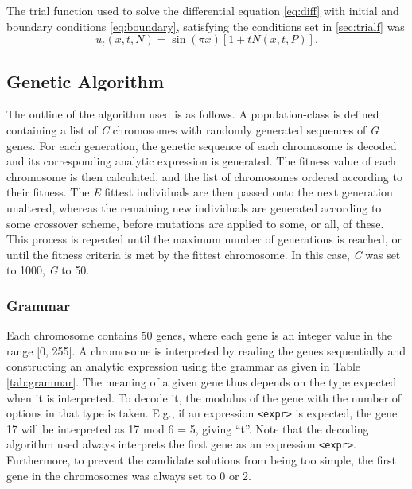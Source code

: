 \documentclass[multicolumn, 9pt]{extarticle}
\begin{document}
The trial function used to solve the differential equation \eqref{eq:diff} with initial and boundary conditions \eqref{eq:boundary}, satisfying the conditions set in \ref{sec:trialf} was
\begin{equation}
	u_t(x, t, N) = \sin{(\pi x)}[1 + tN(x, t, P)].
\end{equation}


\subsection{Genetic Algorithm}
The outline of the algorithm used is as follows. A population-class is defined containing a list of \textit{C} chromosomes with randomly generated sequences of \textit{G} genes. For each generation, the genetic sequence of each chromosome is decoded and its corresponding analytic expression is generated. The fitness value of each chromosome is then calculated, and the list of chromosomes ordered according to their fitness. 
The \textit{E} fittest individuals are then passed onto the next generation unaltered, whereas the remaining new individuals are generated according to some crossover scheme, before mutations are applied to some, or all, of these.  This process is repeated until the maximum number of generations is reached, or until the fitness criteria is met by the fittest chromosome. In this case, \textit{C} was set to 1000, \textit{G} to 50.

\subsubsection{Grammar}
Each chromosome contains 50 genes, where each gene is an integer value in the range [0, 255]. A chromosome is interpreted by reading the genes sequentially and constructing an analytic expression using the grammar as given in Table \ref{tab:grammar}. The meaning of a given gene thus depends on the type expected when it is interpreted. To decode it, the modulus of the gene with the number of options in that type is taken. E.g., if an expression \texttt{<expr>} is expected, the gene 17 will be interpreted as 17 mod 6 = 5, giving ``t''. Note that the decoding algorithm used always interprets the first gene as an expression \texttt{<expr>}.  Furthermore, to prevent the candidate solutions from being too simple, the first gene in the chromosomes was always set to 0 or 2.
\end{document}

